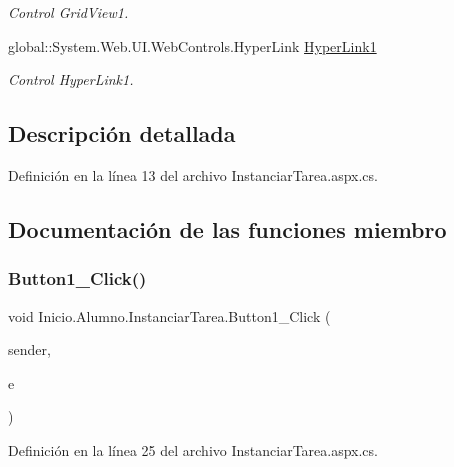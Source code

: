 \begin{DoxyCompactItemize}
\begin{DoxyCompactList}\small\item\em Control Grid\+View1. \end{DoxyCompactList}\item 
global\+::\+System.\+Web.\+U\+I.\+Web\+Controls.\+Hyper\+Link \mbox{\hyperlink{classInicio_1_1Alumno_1_1InstanciarTarea_a94f3a60064049cdaa85c24a497788549}{Hyper\+Link1}}
\begin{DoxyCompactList}\small\item\em Control Hyper\+Link1. \end{DoxyCompactList}\end{DoxyCompactItemize}


\subsection{Descripción detallada}


Definición en la línea 13 del archivo Instanciar\+Tarea.\+aspx.\+cs.



\subsection{Documentación de las funciones miembro}
\mbox{\label{classInicio_1_1Alumno_1_1InstanciarTarea_acc66a1f6cd785abeb08a0bb7d80b0d94}} 
\subsubsection{\texorpdfstring{Button1\_Click()}{Button1\_Click()}}
{\footnotesize\ttfamily void Inicio.\+Alumno.\+Instanciar\+Tarea.\+Button1\+\_\+\+Click (\begin{DoxyParamCaption}\item[{object}]{sender,  }\item[{Event\+Args}]{e }\end{DoxyParamCaption})\hspace{0.3cm}{\ttfamily [protected]}}



Definición en la línea 25 del archivo Instanciar\+Tarea.\+aspx.\+cs.


